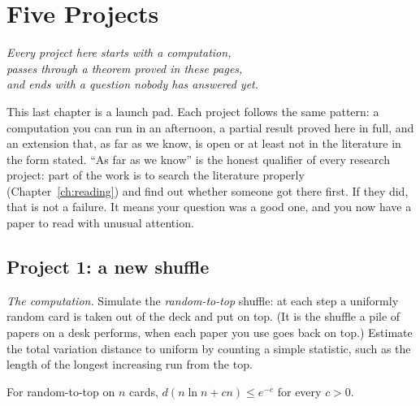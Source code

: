 \chapter{Five Projects}
\label{ch:projects}

\begin{center}\itshape
Every project here starts with a computation,\\
passes through a theorem proved in these pages,\\
and ends with a question nobody has answered yet.
\end{center}

This last chapter is a launch pad. Each project follows the same pattern: a computation you can run in an afternoon, a partial result proved here in full, and an extension that, as far as we know, is open or at least not in the literature in the form stated. ``As far as we know'' is the honest qualifier of every research project: part of the work is to search the literature properly (Chapter~\ref{ch:reading}) and find out whether someone got there first. If they did, that is not a failure. It means your question was a good one, and you now have a paper to read with unusual attention.

\section{Project 1: a new shuffle}

\emph{The computation.} Simulate the \emph{random-to-top} shuffle: at each step a uniformly random card is taken out of the deck and put on top. (It is the shuffle a pile of papers on a desk performs, when each paper you use goes back on top.) Estimate the total variation distance to uniform by counting a simple statistic, such as the length of the longest increasing run from the top.

\begin{proposition}\label{prop:randomtotop}
For random-to-top on $n$ cards, $d(n\ln n+cn)\le e^{-c}$ for every $c>0$.
\end{proposition}

